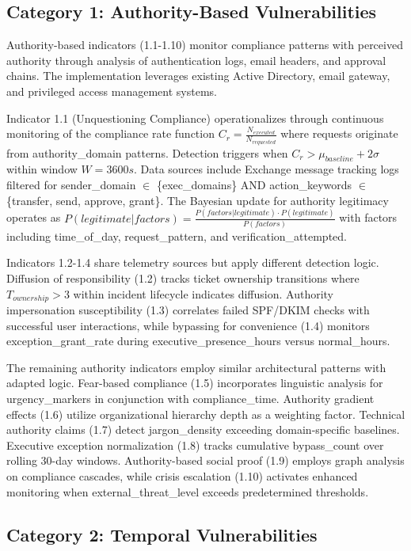 \documentclass[10pt, twocolumn]{article}
\begin{document}
\subsection{Category 1: Authority-Based Vulnerabilities}

Authority-based indicators (1.1-1.10) monitor compliance patterns with perceived authority through analysis of authentication logs, email headers, and approval chains. The implementation leverages existing Active Directory, email gateway, and privileged access management systems.

Indicator 1.1 (Unquestioning Compliance) operationalizes through continuous monitoring of the compliance rate function $C_r = \frac{N_{executed}}{N_{requested}}$ where requests originate from authority\_domain patterns. Detection triggers when $C_r > \mu_{baseline} + 2\sigma$ within window $W = 3600s$. Data sources include Exchange message tracking logs filtered for sender\_domain $\in$ \{exec\_domains\} AND action\_keywords $\in$ \{transfer, send, approve, grant\}. The Bayesian update for authority legitimacy operates as $P(legitimate|factors) = \frac{P(factors|legitimate) \cdot P(legitimate)}{P(factors)}$ with factors including time\_of\_day, request\_pattern, and verification\_attempted.

Indicators 1.2-1.4 share telemetry sources but apply different detection logic. Diffusion of responsibility (1.2) tracks ticket ownership transitions where $T_{ownership} > 3$ within incident lifecycle indicates diffusion. Authority impersonation susceptibility (1.3) correlates failed SPF/DKIM checks with successful user interactions, while bypassing for convenience (1.4) monitors exception\_grant\_rate during executive\_presence\_hours versus normal\_hours.

The remaining authority indicators employ similar architectural patterns with adapted logic. Fear-based compliance (1.5) incorporates linguistic analysis for urgency\_markers in conjunction with compliance\_time. Authority gradient effects (1.6) utilize organizational hierarchy depth as a weighting factor. Technical authority claims (1.7) detect jargon\_density exceeding domain-specific baselines. Executive exception normalization (1.8) tracks cumulative bypass\_count over rolling 30-day windows. Authority-based social proof (1.9) employs graph analysis on compliance cascades, while crisis escalation (1.10) activates enhanced monitoring when external\_threat\_level exceeds predetermined thresholds.

\subsection{Category 2: Temporal Vulnerabilities}
\end{document}
